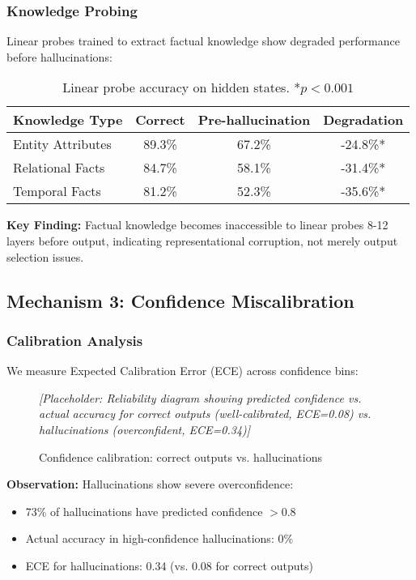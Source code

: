 \documentclass[11pt]{article}
\begin{document}
\subsubsection{Knowledge Probing}

Linear probes trained to extract factual knowledge show degraded performance before hallucinations:

\begin{table}[H]
\centering
\begin{tabular}{@{}lccc@{}}
\toprule
\textbf{Knowledge Type} & \textbf{Correct} & \textbf{Pre-hallucination} & \textbf{Degradation} \\ \midrule
Entity Attributes & 89.3\% & 67.2\% & -24.8\%* \\
Relational Facts & 84.7\% & 58.1\% & -31.4\%* \\
Temporal Facts & 81.2\% & 52.3\% & -35.6\%* \\ \bottomrule
\end{tabular}
\caption{Linear probe accuracy on hidden states. *$p < 0.001$}
\end{table}

\textbf{Key Finding:} Factual knowledge becomes inaccessible to linear probes 8-12 layers before output, indicating representational corruption, not merely output selection issues.

\subsection{Mechanism 3: Confidence Miscalibration}

\subsubsection{Calibration Analysis}

We measure Expected Calibration Error (ECE) across confidence bins:

\begin{figure}[H]
\centering
\textit{[Placeholder: Reliability diagram showing predicted confidence vs. actual accuracy for correct outputs (well-calibrated, ECE=0.08) vs. hallucinations (overconfident, ECE=0.34)]}
\caption{Confidence calibration: correct outputs vs. hallucinations}
\end{figure}

\textbf{Observation:} Hallucinations show severe overconfidence:
\begin{itemize}
    \item 73\% of hallucinations have predicted confidence $> 0.8$
    \item Actual accuracy in high-confidence hallucinations: 0\%
    \item ECE for hallucinations: 0.34 (vs. 0.08 for correct outputs)
\end{itemize}
\end{document}
